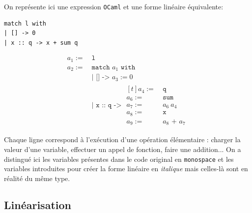 \begin{example}
    On représente ici une expression \texttt{OCaml} et une forme linéaire
    équivalente:

    \small
    \begin{minipage}{0.3\textwidth}
        \begin{verbatim}
match l with
| [] -> 0
| x :: q -> x + sum q
        \end{verbatim}
    \end{minipage}%
    \begin{minipage}{0.7\textwidth}
        \begin{align*}
            a_1 := \  & \texttt{l}                                             \\
            a_2 := \  & \texttt{match } a_1 \texttt{ with}                     \\
                      & \texttt{| [] -> } a_3 := 0                             \\
                      & \texttt{| x :: q -> } \begin{aligned}[t]
                                                  a_4 := \  & \texttt{q}           \\
                                                  a_6 := \  & \texttt{sum}         \\
                                                  a_7 := \  & a_6 \ a_4            \\
                                                  a_8 := \  & \texttt{x}           \\
                                                  a_9 := \  & a_8 \texttt{ + } a_7
                                              \end{aligned}
        \end{align*}
    \end{minipage}

    \normalsize
    \bigskip

    Chaque ligne correspond à l'exécution d'une opération élémentaire : charger
    la valeur d'une variable, effectuer un appel de fonction, faire une addition...
    On a distingué ici les variables présentes dans le code original en
    \texttt{monospace} et les variables introduites pour créer la forme linéaire
    en \textit{italique} mais celles-là sont en réalité du même type.
\end{example}

\subsection{Linéarisation}

